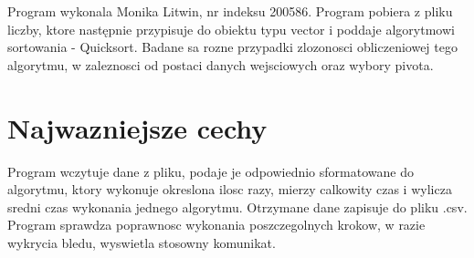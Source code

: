 \-Program wykonala \-Monika \-Litwin, nr indeksu 200586. \-Program pobiera z pliku liczby, ktore następnie przypisuje do obiektu typu vector i poddaje algorytmowi sortowania -\/ \-Quicksort. \-Badane sa rozne przypadki zlozonosci obliczeniowej tego algorytmu, w zaleznosci od postaci danych wejsciowych oraz wybory pivota.\hypertarget{index_etykieta-Wazne-cechy}{}\section{\-Najwazniejsze cechy}\label{index_etykieta-Wazne-cechy}
\-Program wczytuje dane z pliku, podaje je odpowiednio sformatowane do algorytmu, ktory wykonuje okreslona ilosc razy, mierzy calkowity czas i wylicza sredni czas wykonania jednego algorytmu. \-Otrzymane dane zapisuje do pliku .csv. \-Program sprawdza poprawnosc wykonania poszczegolnych krokow, w razie wykrycia bledu, wyswietla stosowny komunikat. 